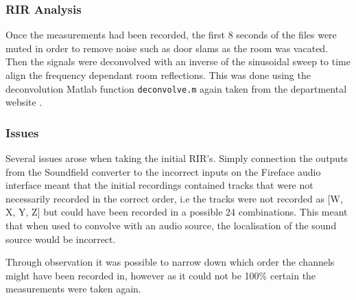 \documentclass[../../main.tex]{subfiles}
\begin{document}
	\subsubsection{RIR Analysis}

		Once the measurements had been recorded, the first 8 seconds of the files were muted in order to remove noise such as door slams as the room was vacated. Then the signals were deconvolved with an inverse of the sinusoidal sweep to time align the frequency dependant room reflections. This was done using the deconvolution Matlab function \texttt{deconvolve.m} again taken from the departmental website \cite{sineSweep}.

	\subsubsection{Issues}
		Several issues arose when taking the initial \ac{RIR}'s. Simply connection the outputs from the Soundfield converter to the incorrect inputs on the Fireface audio interface meant that the initial recordings contained tracks that were not necessarily recorded in the correct order, i.e the tracks were not recorded as [W, X, Y, Z] but could have been recorded in a possible 24 combinations. This meant that when used to convolve with an audio source, the localisation of the sound source would be incorrect.

		Through observation it was possible to narrow down which order the channels might have been recorded in, however as it could not be 100\% certain the measurements were taken again.








\end{document}
